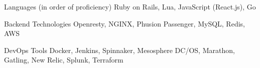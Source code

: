 

\begin{cvskills}

  \cvskill
    {Languages (in order of proficiency)} %
    {Ruby on Rails, Lua, JavaScript (React.js), Go} %


  \cvskill
    {Backend Technologies} %
    {Openresty, NGINX, Phusion Passenger, MySQL, Redis, AWS} %

  \cvskill
    {DevOps Tools} %
    {Docker, Jenkins, Spinnaker, Mesosphere DC/OS, Marathon, Gatling, New Relic, Splunk, Terraform} %

\end{cvskills}
